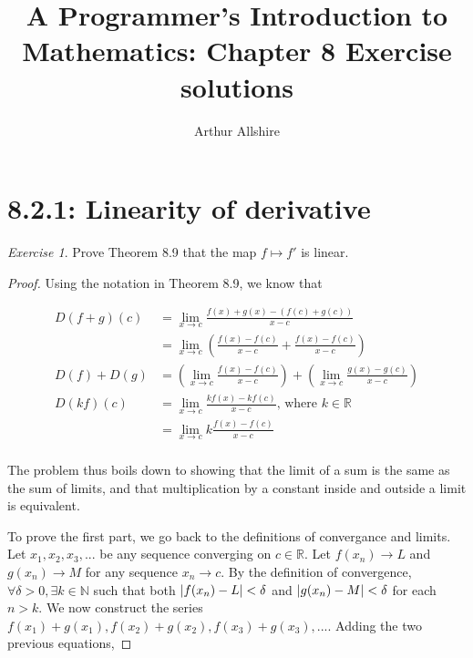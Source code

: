 \documentclass{article}
\author{Arthur Allshire}
\title{A Programmer's Introduction to Mathematics: Chapter 8 Exercise solutions}
\DeclarePairedDelimiter\abs{\lvert}{\rvert}%
\theoremstyle{remark}
\newtheorem*{exercise}{Exercise}
\begin{document}
\maketitle

\section*{8.2.1: Linearity of derivative}
\begin{exercise}
    Prove Theorem 8.9 that the map $f \mapsto f'$ is linear.
\end{exercise}

\begin{proof}
Using the notation in Theorem 8.9, we know that

\[
\begin{aligned}
    D(f+g)(c) &= \lim_{x \to c} \frac{f(x)+g(x) - (f(c) + g(c))}{x-c} \\
              &= \lim_{x \to c} (\frac{f(x)-f(c)}{x-c} + \frac{f(x)-f(c)}{x-c}) \\
    D(f)+D(g) &= (\lim_{x \to c} \frac{f(x)-f(c)}{x-c}) + (\lim_{x \to c} \frac{g(x)-g(c)}{x-c}) \\
    D(kf)(c) &= \lim_{x \to c} \frac{kf(x) - kf(c)}{x-c} \text{, where } k \in \mathbb{R} \\
             &= \lim_{x \to c} k \frac{f(x)-f(c)}{x-c} \\
\end{aligned}
\]

The problem thus boils down to showing that the limit of a sum is the same as the sum of limits,
and that multiplication by a constant inside and outside a limit is equivalent.

To prove the first part, we go back to the definitions of convergance and limits. Let
$x_1, x_2, x_3, ...$ be any sequence converging on $c \in \mathbb{R}$.
Let $f(x_n) \rightarrow L$ and $g(x_n) \rightarrow M$ for any sequence $x_n \rightarrow c$.
By the definition of convergence,
$\forall \delta > 0, \exists k \in \mathbb{N}$ such that both
$\abs{f(x_n) - L} < \delta$ and $\abs{g(x_n) - M} < \delta$ for each $n>k$.
We now construct the series $f(x_1)+g(x_1), f(x_2)+g(x_2), f(x_3)+g(x_3), ...$.
Adding the two previous equations,


\end{proof}
\end{document}
